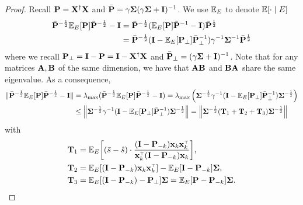 \documentclass[11pt]{article}
\begin{document}
\begin{proof}
Recall $\mathbf P = \mathbf X^\dagger \mathbf X$ and $\bar{\mathbf P}= \gamma\mathbf{\Sigma}(\gamma\mathbf{\Sigma}+\mathbf I)^{-1}$. We use $\mathbb E_E$ to denote $\mathbb E[\cdot\mid E]$
   \begin{align*}
     \bar{\mathbf P}^{-\frac12}\mathbb E_E[\mathbf P]\bar{\mathbf P}^{-\frac12} - \mathbf I
     &=\bar{\mathbf P}^{-\frac12}(\mathbb E_E[\mathbf P]\bar{\mathbf P}^{-1} - \mathbf I)\bar{\mathbf P}^{\frac12}
     \\
     &=\bar{\mathbf P}^{-\frac12}(\mathbf I-\mathbb E_E[\mathbf P_\perp]\bar{\mathbf P}_\perp^{-1})\gamma^{-1}\mathbf{\Sigma}^{-1}\bar{\mathbf P}^{\frac12}
   \end{align*}
   where we recall $\mathbf P_\perp = \mathbf I - \mathbf P = \mathbf I - \mathbf X^\dagger \mathbf X$ and $\bar {\mathbf P}_\perp = (\gamma \mathbf{\Sigma} + \mathbf I)^{-1}$. Note that for any matrices $\mathbf A, \mathbf B$ of the same dimension, we have that $\mathbf A\mathbf B$ and $\mathbf B \mathbf A$ share the same eigenvalue. As a consequence, 
  \begin{align*}
    \| \bar{\mathbf P}^{-\frac12}\mathbb E_E[\mathbf P]\bar{\mathbf P}^{-\frac12} - \mathbf I \| &= \lambda_{\max} (\bar{\mathbf P}^{-\frac12}\mathbb E_E[\mathbf P]\bar{\mathbf P}^{-\frac12} - \mathbf I) = \lambda_{\max} \left( \mathbf{\Sigma}^{-\frac12} \gamma^{-1}( \mathbf I - \mathbb E_E[\mathbf P_\perp] \bar {\mathbf P}_\perp^{-1}) \mathbf{\Sigma}^{-\frac12} \right) \\
    & \le \left\| \mathbf{\Sigma}^{-\frac12} \gamma^{-1}( \mathbf I - \mathbb E_E[\mathbf P_\perp] \bar {\mathbf P}_\perp^{-1}) \mathbf{\Sigma}^{-\frac12} \right\| = \left\|  \mathbf{\Sigma}^{-\frac12} (\mathbf{T}_1 + \mathbf{T}_2 + \mathbf{T}_3) \mathbf{\Sigma}^{-\frac12} \right\|
  \end{align*}
  with
   \begin{align*}
     \T_1
     &= \E_E\bigg[(\bar s - \hat s)\cdot
            \frac{ ( \I - \P_{-k}) \x_k\x_k^\top}{\x_k^\top ( \I - \P_{-k}) \x_k}\bigg],
     \\
     \T_2 
     &=\E_E[ ( \I - \P_{-k}) \x_k\x_k^\top] - \E_E[\I - \P_{-k}]\Sigmab,
     \\
     \T_3
     &=\E_E[ (\I - \P_{-k}) - \P_\perp]\Sigmab = \E_E[ \P - \P_{-k}]\Sigmab.
   \end{align*}



\end{proof}
\end{document}
